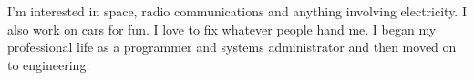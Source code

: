

\begin{cvparagraph}

I'm interested in space, radio communications and anything involving electricity.  I also work on cars for fun.  I love to fix whatever people hand me.  I began my professional life as a programmer and systems administrator and then moved on to engineering.
\end{cvparagraph}
